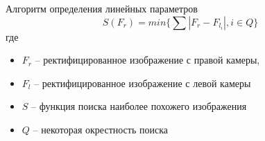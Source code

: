 \begin{frame}{Алгоритм определения линейных параметров}
\begin{equation*}
    S(F_{r}) = min\{ \sum |F_{r} - F_{l_{i}} |, i \in Q\}
\end{equation*}
где
\begin{itemize}[noitemsep]
    \item $F_{r}$ -- ректифицированное изображение с правой камеры,
    \item $F_{l}$ -- ректифицированное изображение с левой камеры
    \item $S$ -- функция поиска наиболее похожего изображения
    \item $Q$ -- некоторая окрестность поиска
\end{itemize}
\end{frame}